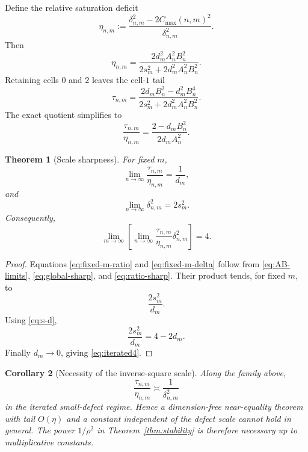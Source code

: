 \documentclass[11pt]{article}
\newtheorem{theorem}{Theorem}[section]
\newtheorem{corollary}[theorem]{Corollary}
\newcommand{\cmax}{C_{\max}}
\newcommand{\dd}{\delta}
\newcommand{\etaq}{\eta}
\newcommand{\tauq}{\tau}
\begin{document}
Define the relative saturation deficit
\[
  \etaq_{n,m}
  :=
  \frac{\dd_{n,m}^2-2\cmax(n,m)^2}{\dd_{n,m}^2}.
\]
Then
\begin{equation}\label{eq:eta-sharp}
  \boxed{
  \etaq_{n,m}
  =
  \frac{
    2d_m^2A_n^2B_n^2
  }{
    2s_m^2+2d_m^2A_n^2B_n^2
  }.
  }
\end{equation}
Retaining cells $0$ and $2$ leaves the cell-$1$ tail
\begin{equation}\label{eq:tau-sharp}
  \tauq_{n,m}
  =
  \frac{
    2d_mB_n^2-d_m^2B_n^4
  }{
    2s_m^2+2d_m^2A_n^2B_n^2
  }.
\end{equation}
The exact quotient simplifies to
\begin{equation}\label{eq:ratio-sharp}
  \boxed{
  \frac{\tauq_{n,m}}{\etaq_{n,m}}
  =
  \frac{2-d_mB_n^2}{2d_mA_n^2}.
  }
\end{equation}

\begin{theorem}[Scale sharpness]\label{thm:scale-sharp}
For fixed $m$,
\begin{equation}\label{eq:fixed-m-ratio}
  \lim_{n\to\infty}
  \frac{\tauq_{n,m}}{\etaq_{n,m}}
  =
  \frac1{d_m},
\end{equation}
and
\begin{equation}\label{eq:fixed-m-delta}
  \lim_{n\to\infty}\dd_{n,m}^2=2s_m^2.
\end{equation}
Consequently,
\begin{equation}\label{eq:iterated4}
  \boxed{
  \lim_{m\to\infty}
  \left[
    \lim_{n\to\infty}
    \frac{\tauq_{n,m}}{\etaq_{n,m}}
    \dd_{n,m}^2
  \right]
  =4.
  }
\end{equation}
\end{theorem}

\begin{proof}
Equations \eqref{eq:fixed-m-ratio} and \eqref{eq:fixed-m-delta} follow from
\eqref{eq:AB-limits}, \eqref{eq:global-sharp}, and
\eqref{eq:ratio-sharp}.  Their product tends, for fixed $m$, to
\[
  \frac{2s_m^2}{d_m}.
\]
Using \eqref{eq:s-d},
\[
  \frac{2s_m^2}{d_m}
  =
  4-2d_m.
\]
Finally $d_m\to0$, giving \eqref{eq:iterated4}.
\end{proof}

\begin{corollary}[Necessity of the inverse-square scale]
Along the family above,
\[
  \frac{\tauq_{n,m}}{\etaq_{n,m}}
  \asymp \frac{1}{\dd_{n,m}^2}
\]
in the iterated small-defect regime.  Hence a dimension-free near-equality
theorem with tail $O(\etaq)$ and a constant independent of the defect scale
cannot hold in general.  The power $1/\rho^2$ in
Theorem~\ref{thm:stability} is therefore necessary up to multiplicative
constants.
\end{corollary}
\end{document}
